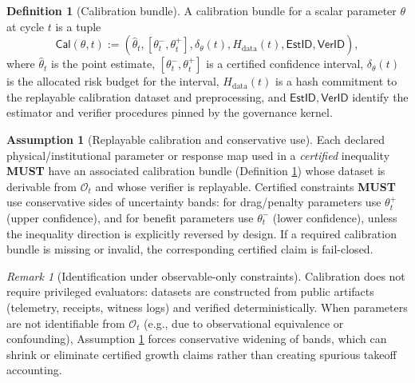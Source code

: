 \documentclass[11pt,a4paper]{article}
\newcommand{\MUST}{\textbf{MUST}}
\newcommand{\cO}{\mathcal{O}}
\theoremstyle{definition}
\newtheorem{definition}{Definition}
\newtheorem{assumption}{Assumption}
\theoremstyle{remark}
\newtheorem{remark}{Remark}
\begin{document}
\begin{definition}[Calibration bundle]\label{def:calibration_bundle}
A calibration bundle for a scalar parameter $\theta$ at cycle $t$ is a tuple
\[
\mathsf{Cal}(\theta,t):=(\hat\theta_t,[\theta_t^{-},\theta_t^{+}],\delta_\theta(t),H_{\mathrm{data}}(t),\mathsf{EstID},\mathsf{VerID}),
\]
where $\hat\theta_t$ is the point estimate, $[\theta_t^{-},\theta_t^{+}]$ is a certified confidence interval, $\delta_\theta(t)$ is the allocated risk budget for the interval, $H_{\mathrm{data}}(t)$ is a hash commitment to the replayable calibration dataset and preprocessing, and $\mathsf{EstID},\mathsf{VerID}$ identify the estimator and verifier procedures pinned by the governance kernel.
\end{definition}

\begin{assumption}[Replayable calibration and conservative use]\label{ass:calibration}
Each declared physical/institutional parameter or response map used in a \emph{certified} inequality \MUST{} have an associated calibration bundle (Definition \ref{def:calibration_bundle}) whose dataset is derivable from $\cO_t$ and whose verifier is replayable.
Certified constraints \MUST{} use conservative sides of uncertainty bands:
for drag/penalty parameters use $\theta_t^{+}$ (upper confidence),
and for benefit parameters use $\theta_t^{-}$ (lower confidence),
unless the inequality direction is explicitly reversed by design.
If a required calibration bundle is missing or invalid, the corresponding certified claim is fail-closed.
\end{assumption}

\begin{remark}[Identification under observable-only constraints]
Calibration does not require privileged evaluators: datasets are constructed from public artifacts (telemetry, receipts, witness logs) and verified deterministically.
When parameters are not identifiable from $\cO_t$ (e.g., due to observational equivalence or confounding), Assumption \ref{ass:calibration} forces conservative widening of bands, which can shrink or eliminate certified growth claims rather than creating spurious takeoff accounting.
\end{remark}
\end{document}
